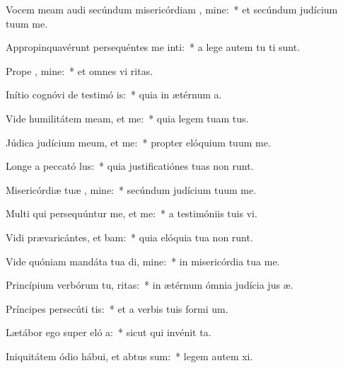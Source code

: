 \item Vocem meam audi secúndum misericórdiam , mine:~* et secúndum judícium tuum  me.
\item Appropinquavérunt persequéntes me inti:~* a lege autem tu  ti sunt.
\item Prope  , mine:~* et omnes vi  ritas.
\item Inítio cognóvi de testimó is:~* quia in ætérnum  a.
\item Vide humilitátem meam, et  me:~* quia legem tuam   tus.
\item Júdica judícium meum, et  me:~* propter elóquium tuum  me.
\item Longe a peccató lus:~* quia justificatiónes tuas non runt.
\item Misericórdiæ tuæ , mine:~* secúndum judícium tuum  me.
\item Multi qui persequúntur me, et  me:~* a testimóniis tuis  vi.
\item Vidi prævaricántes, et bam:~* quia elóquia tua non runt.
\item Vide quóniam mandáta tua di, mine:~* in misericórdia tua  me.
\item Princípium verbórum tu, ritas:~* in ætérnum ómnia judícia jus æ.
\item Príncipes persecúti   tis:~* et a verbis tuis formi  um.
\item Lætábor ego super eló a:~* sicut qui invénit  ta.
\item Iniquitátem ódio hábui, et abtus sum:~* legem autem  xi.
